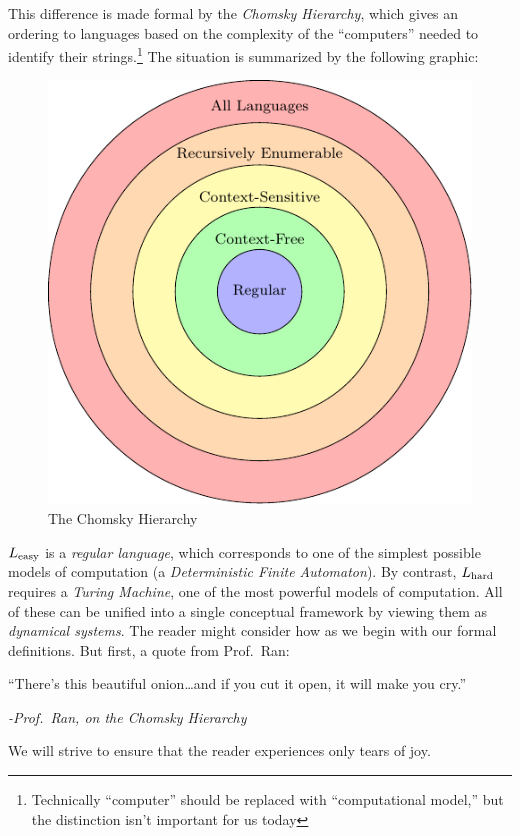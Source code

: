 \documentclass{fkpaper}
\begin{document}
\begin{multicols}{2}
This difference is made formal by the \emph{Chomsky Hierarchy}, which
gives an ordering to languages based on the complexity of the
``computers'' needed to identify their strings.\footnote{Technically
  ``computer'' should be replaced with ``computational model,'' but
  the distinction isn't important for us today} The situation is
summarized by the following graphic:
\begin{figure}[H]
  \centering
  \includegraphics[scale=.8]{figures/chomsky-hierarchy.pdf}
  \caption{The Chomsky Hierarchy}
  \label{fig:chomsky-hierarchy}
\end{figure}
$L_{\rm easy}$ is a \emph{regular language}, which corresponds to one
of the simplest possible models of computation (a \emph{Deterministic
  Finite Automaton}). By contrast, $L_{\rm hard}$ requires a
\emph{Turing Machine}, one of the most powerful models of computation.
All of these can be unified into a single conceptual framework by
viewing them as \emph{dynamical systems}. The reader might consider
how as we begin with our formal definitions. But first, a quote from
Prof.\ Ran:
\begin{leftbar}
  ``There's this beautiful onion\ldots and if you cut it open, it will
  make you cry.''

  {\hfill\itshape -Prof.\ Ran, on the Chomsky Hierarchy}
\end{leftbar}
We will strive to ensure that the reader experiences only tears of
joy.



\end{multicols}
\end{document}
